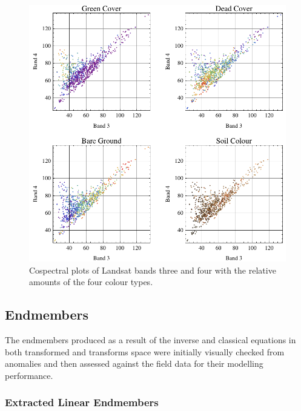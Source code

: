 \documentclass[remotesensing,article,accept,moreauthors,pdftex,12pt,a4paper]{mdpi}
\begin{document}
\begin{figure}
\includegraphics{bandPlots.pdf}
\caption{\label{fig:SpecCrossPlots}Cospectral plots of Landsat bands three and four with the relative amounts of the four colour types. }
\end{figure} 

 \subsection{Endmembers}

%
%
The endmembers produced as a result of the inverse and classical equations in both transformed and transforms space were initially visually checked from anomalies and then assessed against the field data for their modelling performance.



\subsubsection{Extracted Linear Endmembers}
\end{document}
